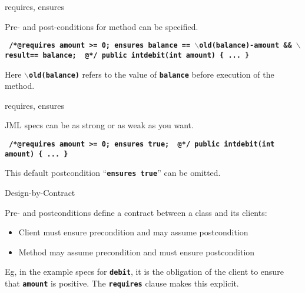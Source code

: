 \documentclass[
pdf,
nocolorBG,
slideColor,
erik,
]{prosper}
\newcommand{\code}[1]{{\rm \texttt{\textbf{\small #1}}}}
\newcommand{\old}     {\(\backslash\)old}
\newcommand{\result}  {\(\backslash\)result}
\begin{document}
\begin{slide}{requires, ensures}
\vspace*{-3ex}

{\blue Pre-} and {\blue post-conditions} for method can be specified.

\begin{alltt}
\texttt{\textbf{\small
{\green /*@}{\blue requires} amount >= 0;
    {\blue ensures}  balance == \old(balance)-amount &&
              \result == balance;
{ \green  @*/}
  public int{\green debit}(int amount) \{ 
    ...
  \}
}}
\end{alltt}

Here \code{\old(balance)} refers to the value of \code{balance}
before execution of the method.


\end{slide}
\begin{slide}{requires, ensures}
\vspace*{-3ex}

JML specs can be as strong or as weak as you want.


\begin{alltt}
\texttt{\textbf{\small
{\green /*@}{\blue requires} amount >= 0;
    {\blue ensures} {\blue true};
{ \green  @*/}
  public int{\green debit}(int amount) \{ 
    ...
  \}
}}
\end{alltt}

This default postcondition ``\code{ensures true}'' can be omitted.

\end{slide}

\begin{slide}{Design-by-Contract}
\vspace*{-3ex}

Pre- and postconditions define a {\blue contract} 
between a class and its clients:
\medskip
\begin{itemize}
\item
Client must {\green ensure precondition}
and may {\green assume postcondition}
\item
Method may {\green assume precondition}
and must {\green ensure postcondition}
\end{itemize}

\bigskip

Eg, in the example specs for \code{debit}, it is the obligation of
the client to ensure that \code{amount} is positive.
The \code{requires} clause makes this {\green explicit}.

\end{slide}
\end{document}
